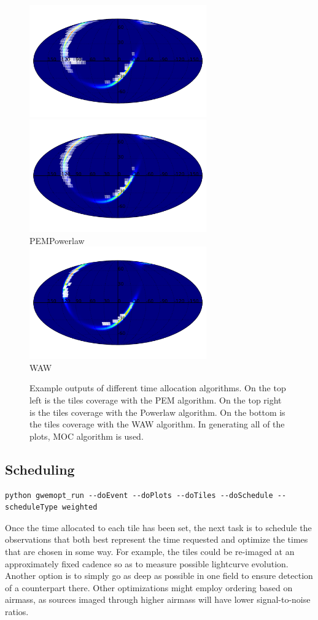 \documentclass[twocolumn]{aastex62}
\begin{document}
\begin{figure}
    \centering
    \includegraphics[width=3in]{plots/coverage_pem.pdf}
    \includegraphics[width=3in]{plots/coverage_powerlaw.pdf}\\
    PEM\hspace{2.6in}Powerlaw\\
    \includegraphics[width=3in]{plots/coverage_waw.pdf}\\
    WAW
    \caption{Example outputs of different time allocation algorithms. On the top left is the tiles coverage with the PEM algorithm. On the top right is the tiles coverage with the Powerlaw algorithm. On the bottom is the tiles coverage with the WAW algorithm. In generating all of the plots, MOC algorithm is used.}
    \label{fig:timealloc}
\end{figure}


\subsection{Scheduling}
\label{subsection:scheduling}
\begin{lstlisting}
python gwemopt_run --doEvent --doPlots --doTiles --doSchedule --scheduleType weighted
\end{lstlisting}
Once the time allocated to each tile has been set, the next task is to schedule the observations that both best represent the time requested and optimize the times that are chosen in some way. 
For example, the tiles could be re-imaged at an approximately fixed cadence so as to measure possible lightcurve evolution.
Another option is to simply go as deep as possible in one field to ensure detection of a counterpart there.
Other optimizations might employ ordering based on airmass, as sources imaged through higher airmass will have lower signal-to-noise ratios.
\end{document}
